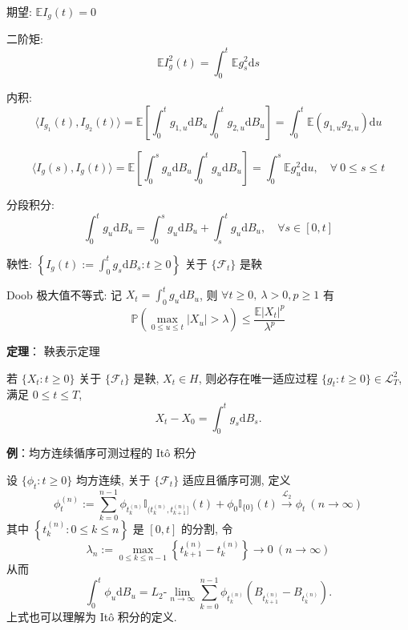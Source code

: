 \documentclass[openany]{ctexbook}
\theoremstyle{kaiti}
\theoremstyle{normal}
\begin{document}
期望: $\mathbb{E}I_g(t)=0$

二阶矩:
\begin{equation}
  \mathbb{E}I_g^2(t)=\int_0^t\mathbb{E}g_s^2\mathrm{d}s
\end{equation}

内积:
\begin{equation}
  \langle I_{g_1}(t),I_{g_2}(t)\rangle=\mathbb{E}\left[\int_0^tg_{1,u}\mathrm{d}B_u\int_0^tg_{2,u}\mathrm{d}B_u\right]=\int_0^t \mathbb{E}(g_{1,u}g_{2,u})\mathrm{d}u
\end{equation}

\begin{equation}
  \langle I_{g}(s),I_{g}(t)\rangle=\mathbb{E}\left[\int_0^sg_{u}\mathrm{d}B_u\int_0^tg_{u}\mathrm{d}B_u\right]=\int_0^s \mathbb{E}g_u^2\mathrm{d}u,\quad\forall~0\leqslant s\leqslant t
\end{equation}

分段积分:
\begin{equation}
  \int_0^tg_u\mathrm{d}B_u=\int_0^sg_u\mathrm{d}B_u+\int_s^tg_u\mathrm{d}B_u,\quad\forall s\in[0,t]
\end{equation}

鞅性: $\displaystyle\left\{I_g(t):=\int_0^tg_s\mathrm{d}B_s:t\geqslant0\right\}$ 关于 $\{\mathcal{F}_t\}$ 是鞅

Doob 极大值不等式: 记 $\displaystyle X_t=\int_0^tg_u\mathrm{d}B_u$, 则 $\forall t\geqslant0,~\lambda>0,p\geqslant1$ 有
\begin{equation}
  \mathbb{P}\left(\max_{0\leqslant u\leqslant t}|X_u|>\lambda\right)\leqslant\frac{\mathbb{E}|X_t|^p}{\lambda^p}
\end{equation}

\textbf{定理}： 鞅表示定理

若 $\{X_t:t\geqslant0\}$ 关于 $\{\mathcal{F}_t\}$ 是鞅, $X_t\in H$, 则必存在唯一适应过程 $\{g_t:t\geqslant0\}\in\mathcal{L}_T^2$, 满足 $0\leqslant t\leqslant T$,
\begin{equation}
  X_t-X_0=\int_0^tg_s\mathrm{d}B_s.
\end{equation}

\textbf{例}：均方连续循序可测过程的 It\^o 积分

设 $\{\phi_t:t\geqslant0\}$ 均方连续, 关于 $\{\mathcal{F}_t\}$ 适应且循序可测, 定义
\begin{equation}
  \phi_t^{(n)}:=\sum_{k=0}^{n-1}\phi_{t_k^{(n)}}\mathbb{I}_{(t_k^{(n)},t_{k+1}^{(n)}]}(t)+\phi_0\mathbb{I}_{\{0\}}(t)\overset{\mathrm{\mathcal{L}_2}}{\to}\phi_t~(n\to\infty)
\end{equation}
其中 $\left\{t_k^{(n)}:0\leqslant k\leqslant n\right\}$ 是 $[0,t]$ 的分割, 令
\begin{equation}
  \lambda_n:=\max_{0\leqslant k\leqslant n-1}\left\{t_{k+1}^{(n)}-t_{k}^{(n)}\right\}\to0~(n\to\infty)
\end{equation}
从而
\begin{equation}
  \int_0^t\phi_u\mathrm{d}B_u=L_2\text{-}\lim_{n\to\infty}\sum_{k=0}^{n-1}\phi_{t_k^{(n)}}\left(B_{t_{k+1}^{(n)}}-B_{t_{k}^{(n)}}\right).
\end{equation}
上式也可以理解为 It\^o 积分的定义.
\end{document}
